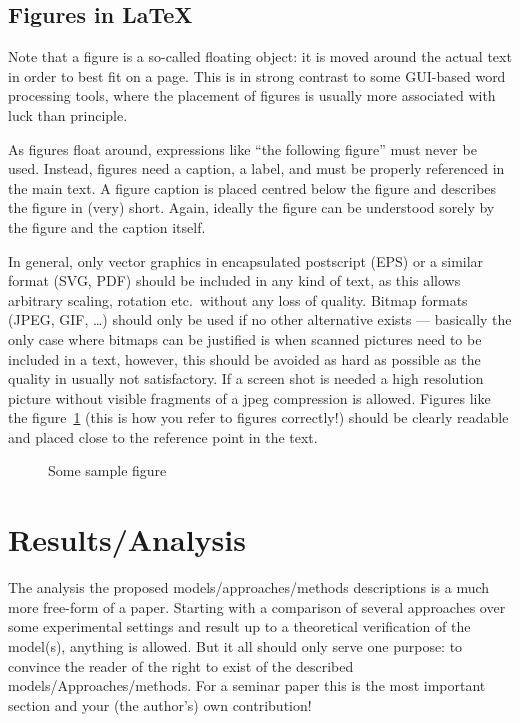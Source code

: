 \documentclass[conference]{IEEEtran}  %
\theoremstyle{plain}
\theoremstyle{definition}
\theoremstyle{remark}
\begin{document}
\subsection{Figures in \LaTeX}
\label{sec:model:subsec:figures}
Note that a figure is a so-called floating object: it is moved around the actual text in order to best fit on a page. This is in strong contrast to some GUI-based word processing tools, where the placement of figures is usually more associated with luck than principle.

As figures float around, expressions like ``the following figure'' must never be used. Instead, figures need a caption, a label, and must be properly referenced in the main text. A figure caption is placed centred below the figure and describes the figure in (very) short. Again, ideally the figure can be understood sorely by the figure and the caption itself.

In general, only vector graphics in encapsulated postscript (EPS) or a similar format (SVG, PDF) should be included in any kind of text, as this allows arbitrary scaling, rotation etc.\ without any loss of quality. Bitmap formats (JPEG, GIF, \dots) should only be used if no other alternative exists --- basically the only case where bitmaps can be justified is when scanned pictures need to be included in a text, however, this should be avoided as hard as possible as the quality in usually not satisfactory. If a screen shot is needed a high resolution picture without visible fragments of a jpeg compression is allowed. Figures like the figure~\ref{fig:samplefig} (this is how you refer to figures correctly!) should be clearly readable and placed close to the reference point in the text.

\begin{figure}[h]
\caption{Some sample figure}\label{fig:samplefig}
\end{figure}

\section{Results/Analysis}
\label{sec:analysis}
The analysis the proposed models/approaches/methods descriptions is a much more free-form of a paper. Starting with a comparison of several approaches over some experimental settings and result up to a theoretical verification of the model(s), anything is allowed. But it all should only serve one purpose: to convince the reader of the right to exist of the described models/Approaches/methods. For a seminar paper this is the most important section and your (the author's) own contribution!
\end{document}
